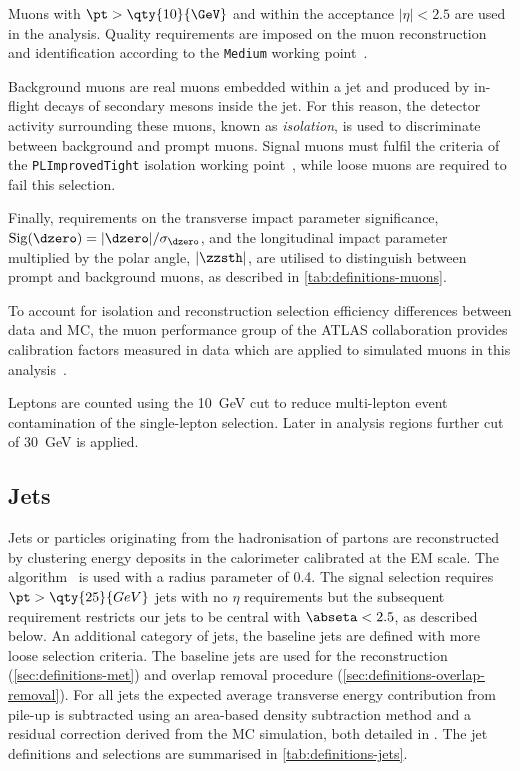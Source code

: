 Muons with \(\pt > \qty{10}{\GeV}\) and within the acceptance \(|\eta| < 2.5\)
are used in the analysis. Quality requirements are imposed on the muon
reconstruction and identification according to the \texttt{Medium} working point~\cite{PERF-2015-10}.

Background muons are real muons embedded within a jet and produced by in-flight
decays of secondary mesons inside the jet. For this reason, the detector
activity surrounding these muons, known as \textit{isolation}, is used
to discriminate between background and prompt muons.
Signal muons must fulfil the criteria of the \texttt{PLImprovedTight} isolation working 
point~\cite{web:PLImprovedWPs},
while loose muons are required to fail this selection.

Finally, requirements on the transverse impact parameter significance,
\( \mathrm{Sig}(\dzero)=|\dzero|/\sigma_{\dzero} \),
and the longitudinal impact parameter multiplied by the polar angle,
\( |\zzsth| \), are utilised to distinguish between prompt and background muons,
as described in \cref{tab:definitions-muons}.

To account for isolation and reconstruction selection efficiency differences
between data and MC, the muon performance group of the ATLAS collaboration
provides calibration factors measured in data which are applied to simulated
muons in this analysis~\cite{web:MuonRecommendations}.

Leptons are counted using the \qty{10}{\GeV} cut to reduce multi-lepton event
contamination of the single-lepton selection. Later in analysis regions
further cut of \qty{30}{\GeV} is applied.


\subsection{Jets}%
\label{sec:definitions-jets}

Jets or particles originating from the hadronisation of partons are
reconstructed by clustering energy deposits in the calorimeter calibrated at
the EM scale. The \antikt algorithm~\cite{Cacciari:2008gp} is used with
a radius parameter of 0.4. The signal selection requires 
\(\pt > \qty{25}{GeV}\) jets with no $\eta$ requirements but the subsequent \bjet
requirement restricts our jets to be central with \(\abseta < 2.5\),
as described below.
An additional category of jets, the baseline jets are defined with more loose
selection criteria. The baseline jets are used for the \met reconstruction (\cref{sec:definitions-met}) and
overlap removal procedure (\cref{sec:definitions-overlap-removal}).
For all jets the expected average transverse energy
contribution from pile-up is subtracted using an area-based \pt density
subtraction method and a residual correction derived from the MC simulation,
both detailed in .
The jet definitions and selections are summarised in \cref{tab:definitions-jets}.

